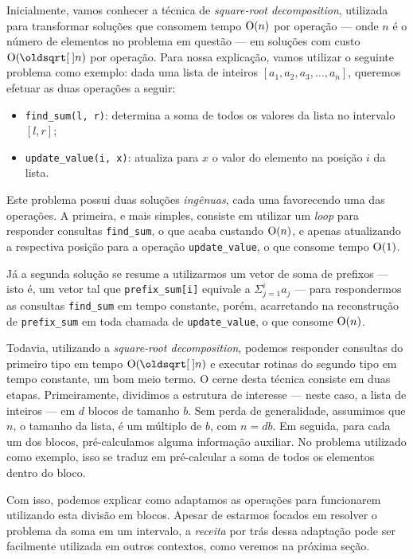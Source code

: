 Inicialmente, vamos conhecer a técnica de \emph{square-root decomposition}, utilizada para transformar soluções que consomem tempo $\mathrm{O}(n)$ por operação --- onde $n$ é o número de elementos no problema em questão --- em soluções com custo $\Oh(\sqrt{n})$ por operação. Para nossa explicação, vamos utilizar o seguinte problema como exemplo: dada uma lista de inteiros $ [ a_1, a_2, a_3, \dots, a_n ] $, queremos efetuar as duas operações a seguir:

\begin{itemize}
    \item \texttt{find\_sum(l, r)}: determina a soma de todos os valores da lista no intervalo $[l,r]$;
    \item \texttt{update\_value(i, x)}: atualiza para $x$ o valor do elemento na posição $i$ da lista.
\end{itemize}

Este problema possui duas soluções \emph{ingênuas}, cada uma favorecendo uma das operações. A primeira, e mais simples, consiste em utilizar um \emph{loop} para responder consultas \texttt{find\_sum}, o que acaba custando $\mathrm{O}(n)$, e apenas atualizando a respectiva posição para a operação \texttt{update\_value}, o que consome tempo $\mathrm{O}(1)$.

Já a segunda solução se resume a utilizarmos um vetor de soma de prefixos --- isto é, um vetor tal que \texttt{prefix\_sum[i]} equivale a $\Sigma_{j=1}^{i} a_j$ --- para respondermos as consultas \texttt{find\_sum} em tempo constante, porém, acarretando na reconstrução de \texttt{prefix\_sum} em toda chamada de \texttt{update\_value}, o que consome $\mathrm{O}(n)$.

Todavia, utilizando a \emph{square-root decomposition}, podemos responder consultas do primeiro tipo em tempo $\Oh(\sqrt{n})$ e executar rotinas do segundo tipo em tempo constante, um bom meio termo. O cerne desta técnica consiste em duas etapas. Primeiramente, dividimos a estrutura de interesse --- neste caso, a lista de inteiros --- em $d$ blocos de tamanho $b$. Sem perda de generalidade, assumimos que $n$, o tamanho da lista, é um múltiplo de $b$, com $n = db$. Em seguida, para cada um dos blocos, pré-calculamos alguma informação auxiliar. No problema utilizado como exemplo, isso se traduz em pré-calcular a soma de todos os elementos dentro do bloco.

Com isso, podemos explicar como adaptamos as operações para funcionarem utilizando esta divisão em blocos. Apesar de estarmos focados em resolver o problema da soma em um intervalo, a \emph{receita} por trás dessa adaptação pode ser facilmente utilizada em outros contextos, como veremos na próxima seção.

